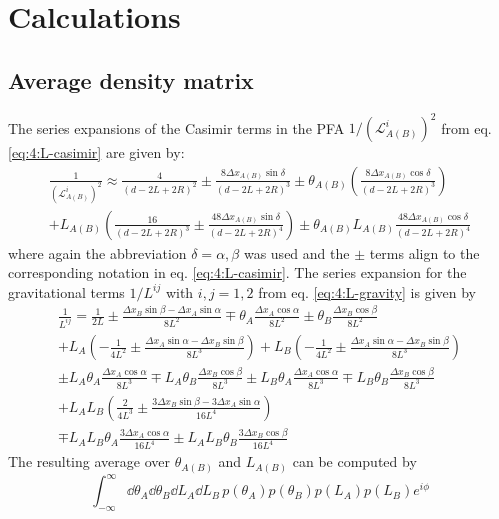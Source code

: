 \chapter{Calculations}

\section{Average density matrix}\label{apx:average-density}

The series expansions of the Casimir terms in the PFA $1/(\mathscr{L}^i_{A(B)})^2$ from eq. \eqref{eq:4:L-casimir} are given by:
\begin{multline}
  \frac{1}{(\mathscr{L}^i_{A(B)})^2} \approx \frac{4}{(d-2L+2R)^2} \pm \frac{8 \Delta x_{A(B)}\sin\delta}{(d-2L+2R)^3}
  \pm \theta_{A(B)}\left(\frac{8\Delta x_{A(B)} \cos\delta}{(d-2L+2R)^3}\right) \\
  + L_{A(B)}\left(\frac{16}{(d-2L+2R)^3} \pm \frac{48\Delta x_{A(B)} \sin\delta}{(d-2L+2R)^4}\right) \pm \theta_{A(B)}L_{A(B)}\frac{48\Delta x_{A(B)} \cos\delta}{(d-2L+2R)^4}
\end{multline}
where again the abbreviation $\delta = \alpha,\beta$ was used and the $\pm$ terms align to the corresponding notation in eq. \eqref{eq:4:L-casimir}. The series expansion for the gravitational terms $1/L^{ij}$ with $i,j = 1,2$ from eq. \eqref{eq:4:L-gravity} is given by
\begin{multline}
  \frac{1}{L^{ij}} = \frac{1}{2L} \pm \frac{\Delta x_B \sin\beta - \Delta x_A \sin\alpha}{8L^2} \mp \theta_A\frac{\Delta x_A\cos\alpha}{8L^2} \pm \theta_B\frac{\Delta x_B\cos\beta}{8L^2} \\
  + L_A \left(-\frac{1}{4L^2} \pm \frac{\Delta x_A \sin\alpha-\Delta x_B \sin\beta}{8L^3}\right)
  + L_B \left(-\frac{1}{4L^2} \pm \frac{\Delta x_A \sin\alpha-\Delta x_B \sin\beta}{8L^3}\right) \\
  \pm L_A \theta_A \frac{\Delta x_A \cos\alpha}{8L^3} \mp L_A \theta_B \frac{\Delta x_B \cos\beta}{8L^3}
  \pm L_B \theta_A \frac{\Delta x_A \cos\alpha}{8L^3} \mp L_B \theta_B \frac{\Delta x_B \cos\beta}{8L^3} \\
  + L_A L_B \left(\frac{2}{4L^3} \pm \frac{3\Delta x_B \sin\beta - 3 \Delta x_A \sin\alpha}{16L^4}\right) \\
  \mp L_A L_B \theta_A \frac{3 \Delta x_A \cos\alpha}{16L^4} \pm L_A L_B \theta_B \frac{3 \Delta x_B \cos\beta}{16L^4}
\end{multline}
The resulting average over $\theta_{A(B)}$ and $L_{A(B)}$ can be computed by
\begin{equation}\label{eq:apx:average-density-element}
  \int_{-\infty}^{\infty} \dd \theta_A \dd \theta_B \dd L_A \dd L_B \, p(\theta_A) p(\theta_B) p(L_A) p(L_B) e^{i \phi}
\end{equation}
